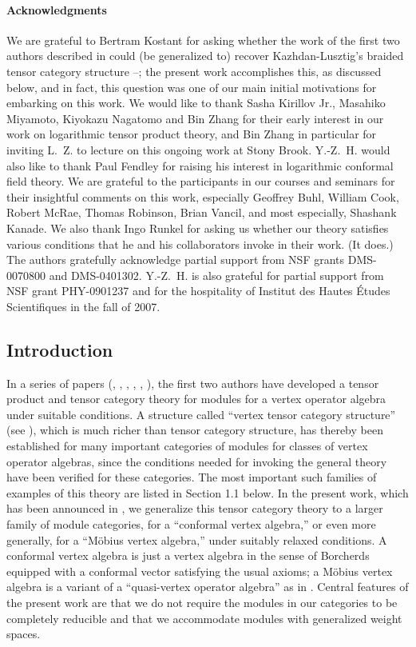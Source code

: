\documentclass[12pt]{article}
\begin{document}
\paragraph{Acknowledgments}
We are grateful to Bertram Kostant for asking whether the work of the
first two authors described in \cite{tensorK} could (be generalized
to) recover Kazhdan-Lusztig's braided tensor category structure
\cite{KL1}--\cite{KL5}; the present work accomplishes this, as
discussed below, and in fact, this question was one of our main
initial motivations for embarking on this work.
We would like to thank Sasha Kirillov Jr., Masahiko Miyamoto, Kiyokazu
Nagatomo and Bin Zhang for their early interest in our work on
logarithmic tensor product theory, and Bin Zhang in particular for
inviting L.~Z. to lecture on this ongoing work at Stony Brook.
Y.-Z.~H. would also like to thank Paul Fendley for raising his
interest in logarithmic conformal field theory.  We are grateful to
the participants in our courses and seminars for their insightful
comments on this work, especially Geoffrey Buhl, William Cook, Robert McRae,
Thomas Robinson, Brian Vancil, and most especially, Shashank Kanade.  We 
also thank Ingo Runkel for asking us whether our theory satisfies
various conditions that he and his collaborators invoke in their work.
(It does.)  The authors gratefully acknowledge partial support {}from
NSF grants DMS-0070800 and DMS-0401302. Y.-Z.~H. is also grateful for
partial support {}from NSF grant PHY-0901237 and for the hospitality
of Institut des Hautes \'{E}tudes Scientifiques in the fall of 2007.



\subsection*{Introduction}


In a series of papers (\cite{tensorAnnounce}, \cite{tensorK},
\cite{tensor1}, \cite{tensor2}, \cite{tensor3}, \cite{tensor4}), the
first two authors have developed a tensor product and tensor category
theory for modules for a vertex operator algebra under suitable
conditions.  A structure called ``vertex tensor category structure''
(see \cite{tensorK}), which is much richer than tensor category
structure, has thereby been established for many important categories
of modules for classes of vertex operator algebras, since the
conditions needed for invoking the general theory have been verified
for these categories.  The most important such families of examples of
this theory are listed in Section 1.1 below.  In the present work,
which has been announced in \cite{HLZ}, we generalize this tensor
category theory to a larger family of module categories, for a
``conformal vertex algebra,'' or even more generally, for a ``M\"obius
vertex algebra,'' under suitably relaxed conditions.  A conformal
vertex algebra is just a vertex algebra in the sense of Borcherds
\cite{B} equipped with a conformal vector satisfying the usual axioms;
a M\"obius vertex algebra is a variant of a ``quasi-vertex operator
algebra'' as in \cite{FHL}.  Central features of the present work are
that we do not require the modules in our categories to be completely
reducible and that we accommodate modules with generalized weight
spaces.
\end{document}
